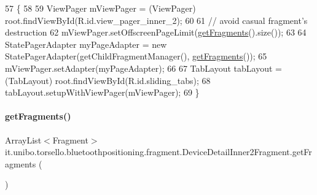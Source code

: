 \begin{DoxyCode}
57                                              \{
58 
59         ViewPager mViewPager = (ViewPager) root.findViewById(R.id.view\_pager\_inner\_2);
60 
61         \textcolor{comment}{// avoid casual fragment's destruction}
62         mViewPager.setOffscreenPageLimit(\hyperlink{classit_1_1unibo_1_1torsello_1_1bluetoothpositioning_1_1fragment_1_1DeviceDetailInner2Fragment_a74ebcb936381919cfe4f3542585203c4_a74ebcb936381919cfe4f3542585203c4}{getFragments}().size());
63 
64         StatePagerAdapter myPageAdapter = \textcolor{keyword}{new} StatePagerAdapter(getChildFragmentManager(), 
      \hyperlink{classit_1_1unibo_1_1torsello_1_1bluetoothpositioning_1_1fragment_1_1DeviceDetailInner2Fragment_a74ebcb936381919cfe4f3542585203c4_a74ebcb936381919cfe4f3542585203c4}{getFragments}());
65         mViewPager.setAdapter(myPageAdapter);
66 
67         TabLayout tabLayout = (TabLayout) root.findViewById(R.id.sliding\_tabs);
68         tabLayout.setupWithViewPager(mViewPager);
69     \}
\end{DoxyCode}
\hypertarget{classit_1_1unibo_1_1torsello_1_1bluetoothpositioning_1_1fragment_1_1DeviceDetailInner2Fragment_a74ebcb936381919cfe4f3542585203c4_a74ebcb936381919cfe4f3542585203c4}{}\label{classit_1_1unibo_1_1torsello_1_1bluetoothpositioning_1_1fragment_1_1DeviceDetailInner2Fragment_a74ebcb936381919cfe4f3542585203c4_a74ebcb936381919cfe4f3542585203c4} 
\paragraph{\texorpdfstring{get\+Fragments()}{getFragments()}}
{\footnotesize\ttfamily Array\+List$<$Fragment$>$ it.\+unibo.\+torsello.\+bluetoothpositioning.\+fragment.\+Device\+Detail\+Inner2\+Fragment.\+get\+Fragments (\begin{DoxyParamCaption}{ }\end{DoxyParamCaption})\hspace{0.3cm}{\ttfamily [private]}}


